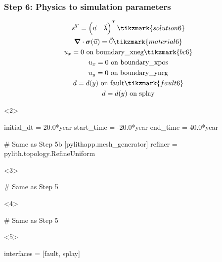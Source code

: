 \documentclass[aspectratio=169]{beamer}
\begin{document}
\begin{frame}[t,fragile]
  \frametitle{Step 6: Physics to simulation parameters}
  \summary{}

  \begin{minipage}[t]{0.3\textwidth}
    {\scriptsize
    \begin{gather*}
    \vec{s}^T = \left( \vec{u} \quad \vec{\lambda} \right)^T \tikzmark{solution6}\\
    \tensor{\nabla} \cdot \tensor{\sigma}(\vec{u}) = \vec{0} \tikzmark{material6}\\
    u_x = 0 \text{ on boundary\_xneg} \tikzmark{bc6}\\
    u_x = 0 \text{ on boundary\_xpos} \\
    u_y = 0 \text{ on boundary\_yneg} \\
    d = d(y) \text{ on fault} \tikzmark{fault6} \\
    d = d(y) \text{ on splay}
    \end{gather*}}
  \end{minipage}
  \hfill
  \begin{minipage}[t]{0.67\textwidth}
    \begin{onlyenv}<2>
      \begin{cfgcode}
        initial_dt = 20.0*year
        start_time = -20.0*year
        end_time = 40.0*year

        # Same as Step 5b
        [pylithapp.mesh_generator]
        refiner = pylith.topology.RefineUniform
      \end{cfgcode}
    \end{onlyenv}
    \begin{onlyenv}<3>
      \begin{cfgcode}
        # Same as Step 5
      \end{cfgcode}
    \end{onlyenv}
    \begin{onlyenv}<4>
      \begin{cfgcode}
        # Same as Step 5
      \end{cfgcode}
    \end{onlyenv}
    \begin{onlyenv}<5>
      \begin{cfgcode}
        interfaces = [fault, splay]


\end{cfgcode}
\end{onlyenv}
\end{minipage}
\end{frame}
\end{document}
